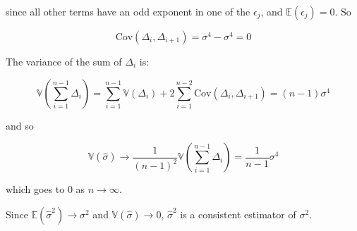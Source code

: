 since all other terms have an odd exponent in one of the \(\epsilon_{j}\),
and \(\mathbb{E}(\epsilon_{j}) = 0\). So

\[ \text{Cov}(\Delta_{i}, \Delta_{i+1}) = \sigma^{4} - \sigma^{4} = 0\]

The variance of the sum of \(\Delta_{i}\) is:

\[ \mathbb{V}\left( \sum_{i=1}^{n-1} \Delta_{i} \right) = \sum_{i=1}^{n-1} \mathbb{V}(\Delta_{i}) + 2 \sum_{i=1}^{n-2} \text{Cov}(\Delta_{i}, \Delta_{i+1}) = (n-1) \sigma^{4}\]

and so

\[ \mathbb{V}(\hat{\sigma}) \rightarrow \frac{1}{(n-1)^{2}} \mathbb{V}\left( \sum_{i=1}^{n-1} \Delta_{i} \right) = \frac{1}{n-1} \sigma^{4} \]

which goes to 0 as \(n \rightarrow \infty\).

Since \(\mathbb{E}(\hat{\sigma}^{2}) \rightarrow \sigma^{2}\) and
\(\mathbb{V}(\hat{\sigma}) \rightarrow 0\), \(\hat{\sigma}^{2}\) is a
consistent estimator of \(\sigma^{2}\).
